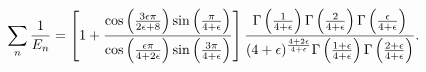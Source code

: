 \begin{equation}
\sum_n {1\over
E_n}=\left[1+{\cos\left({3\epsilon\pi\over2\epsilon+8}\right)\sin
\left({\pi\over4+\epsilon}\right)\over\cos\left({\epsilon\pi\over4+2\epsilon}
\right)\sin\left({3\pi\over4+\epsilon}\right)}\right]{\Gamma\left({1\over4+
\epsilon}\right)\Gamma\left({2\over4+\epsilon}\right)\Gamma\left({\epsilon\over
4+\epsilon}\right)\over(4+\epsilon)^{4+2\epsilon\over4+\epsilon}\Gamma\left({1+
\epsilon\over4+\epsilon}\right)\Gamma\left({2+\epsilon\over4+\epsilon}\right)}.
\label{e14}
\end{equation}

